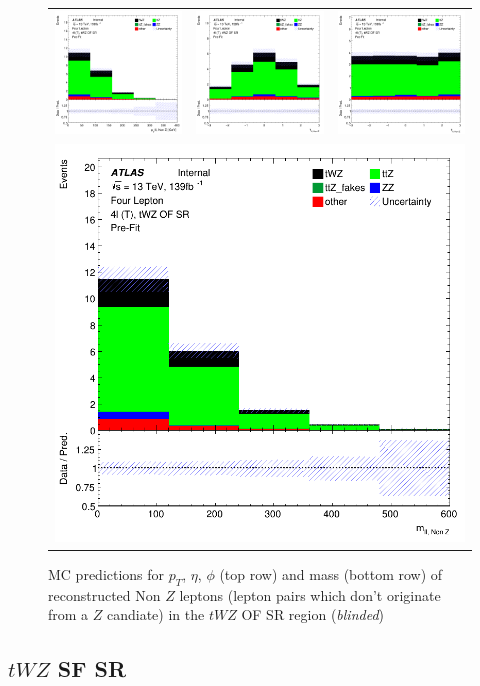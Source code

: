 \begin{figure}[htbp]
\centering
  \begin{tabular}{ccc}

    \includegraphics[width=.2\textwidth]{figures/PreFitPlots/lep4_tWZ_4T_OF_nonZll_sys_pt}&
    \includegraphics[width=.2\textwidth]{figures/PreFitPlots/lep4_tWZ_4T_OF_nonZll_sys_eta} &
    \includegraphics[width=.2\textwidth]{figures/PreFitPlots/lep4_tWZ_4T_OF_nonZll_sys_phi} \\
    \multicolumn{3}{c}{\includegraphics[width=.2\textwidth]{figures/PreFitPlots/lep4_tWZ_4T_OF_nonZll_sys_mass}}

  \end{tabular}
      \caption{MC predictions for $p_{T}$, $\eta$, $\phi$ (top row) and mass (bottom row) of reconstructed Non $Z$ leptons (lepton pairs which don't originate from a $Z$ candiate) in the $tWZ$ OF SR region (\textit{blinded})}
  \label{fig:4lep-OF-SR-NonZLeps-sys-Plots}
\end{figure}



\subsection{$tWZ$ SF SR}
\label{sec:app-controlplotstetralepton-tWZ-SF-SR}

